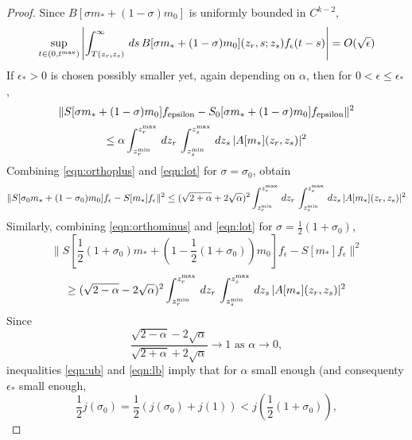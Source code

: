 \begin{proof}
Since $ B[\sigma m_* + (1-\sigma)m_0]$ is uniformly bounded in
$C^{k-2}$,
\[
\sup_{t \in (0,t^{\rm max})} \left|\int_{T(z_r,z_s)}^{\infty}
  \,ds\,B[\sigma m_* + (1-\sigma)m_0](z_r,s;z_s)f_{\epsilon}(t-s)\right| = O(\sqrt{\epsilon})
\]
If $\epsilon_*>0$ is chosen possibly smaller yet, again depending on
$\alpha$, then for $0 <\epsilon\le\epsilon_*$,
\[
\|S[\sigma m_* + (1-\sigma)m_0]f_{\rm epsilon}-S_0[\sigma m_* +
(1-\sigma)m_0]f_{\rm epsilon}\|^2 
\]
\begin{equation}
\label{eqn:lot}
\le \alpha \int_{z_r^{\rm min}}^{z_r^{\rm max}}\,dz_r\,
  \int_{z_s^{\rm min}}^{z_s^{\rm max}}\,dz_s\,|A[m_*](z_r,z_s)|^2
\end{equation}
Combining \ref{eqn:orthoplus} and \ref{eqn:lot} for $\sigma=\sigma_0$, obtain
\begin{equation}
\label{eqn:ub}
\|S[\sigma_0 m_* + (1-\sigma_0)m_0]f_{\epsilon}-S[m_*]f_{\epsilon}\|^2 
\le (\sqrt{2+\alpha}+2\sqrt{\alpha})^2 \int_{z_r^{\rm min}}^{z_r^{\rm max}}\,dz_r\,
  \int_{z_s^{\rm min}}^{z_s^{\rm max}}\,dz_s\,|A[m_*](z_r,z_s)|^2 
\end{equation}
Similarly, combining \ref{eqn:orthominus} and \ref{eqn:lot} for
$\sigma=\frac{1}{2}(1+\sigma_0)$, 
\[
\|S[\frac{1}{2}(1+\sigma_0) m_* + (1-\frac{1}{2}(1+\sigma_0))m_0]f_{\epsilon}-S[m_*]f_{\epsilon}\|^2 
\]
\begin{equation}
\label{eqn:lb}
\ge (\sqrt{2-\alpha}-2\sqrt{\alpha})^2 \int_{z_r^{\rm min}}^{z_r^{\rm max}}\,dz_r\,
  \int_{z_s^{\rm min}}^{z_s^{\rm max}}\,dz_s\,|A[m_*](z_r,z_s)|^2 
\end{equation}
Since 
\[
\frac{\sqrt{2-\alpha}-2\sqrt{\alpha}}{\sqrt{2+\alpha}+2\sqrt{\alpha}}
\rightarrow 1 \mbox{ as } \alpha \rightarrow 0,
\]
inequalities \ref{eqn:ub} and \ref{eqn:lb} imply that for $\alpha$
small enough (and consequenty $\epsilon_*$ small enough,
\[
\frac{1}{2}j(\sigma_0) = \frac{1}{2}(j(\sigma_0) + j(1)) <
j\left(\frac{1}{2}(1+\sigma_0)\right),
\]
\end{proof}

